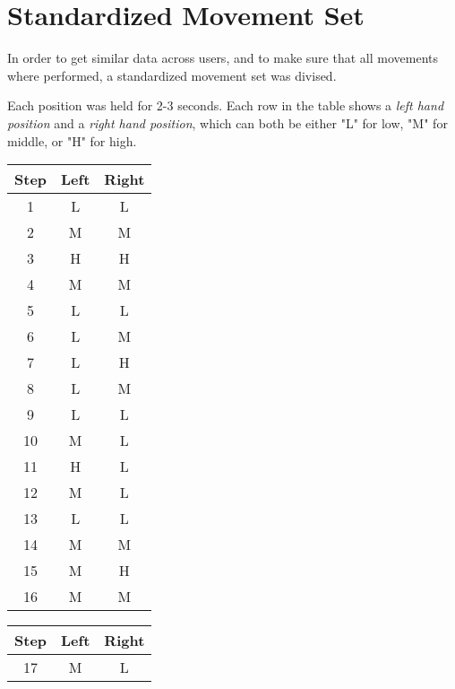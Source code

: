 \chapter{Standardized Movement Set}
\label{appendix: standardized movement set}

In order to get similar data across users, and to make sure that all movements where performed, a standardized movement set was divised.

Each position was held for 2-3 seconds. 
Each row in the table shows a \textit{left hand position} and a \textit{right hand position}, which can both be either "L" for low, "M" for middle, or "H" for high.


\begin{table}[h]
    \centering
    \begin{subtable}[t]{0.2\textwidth}
    \centering
    \begin{tabular}[t]{||c|c|c||}
    \hline
    Step & Left & Right\\
    \hline \hline
      1 & L  & L\\
      \hline
      2 & M  &M\\
      \hline
      3 & H & H\\ 
      \hline
      4 & M & M\\ 
      \hline
      5 & L & L\\ 
      \hline
      6 & L & M\\ 
      \hline
      7 & L & H\\ 
      \hline
      8 & L & M\\ 
      \hline
      9 & L & L\\ 
      \hline
      10 & M & L\\
      \hline
      11 & H & L \\
      \hline
      12 & M & L \\
      \hline
      13 & L & L \\
      \hline
      14 & M & M \\
      \hline
      15 & M & H \\
      \hline
      16 & M & M \\
      \hline
    \end{tabular}
    \end{subtable}
    \begin{subtable}[t]{0.2\textwidth}
    \centering
    \begin{tabular}[t]{||c|c|c||}
    \hline
    Step & Left & Right\\
    \hline \hline
      17 & M & L \\

\end{tabular}
\end{subtable}
\end{table}
